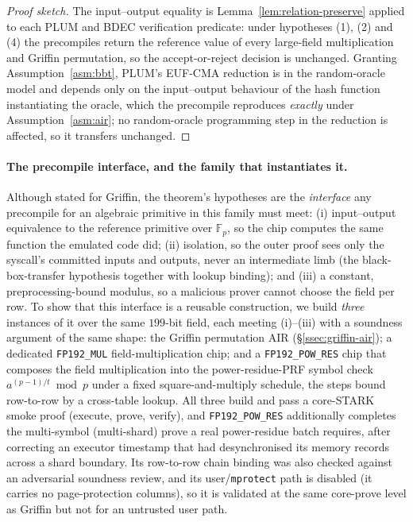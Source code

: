 \begin{proof}[Proof sketch]
The input--output equality is Lemma~\ref{lem:relation-preserve} applied to each PLUM and BDEC verification predicate: under hypotheses (1), (2) and (4) the precompiles return the reference value of every large-field multiplication and Griffin permutation, so the accept-or-reject decision is unchanged. Granting Assumption~\ref{asm:bbt}, PLUM's EUF-CMA reduction is in the random-oracle model and depends only on the input--output behaviour of the hash function instantiating the oracle, which the precompile reproduces \emph{exactly} under Assumption~\ref{asm:air}; no random-oracle programming step in the reduction is affected, so it transfers unchanged.
\end{proof}

\paragraph{The precompile interface, and the family that instantiates it.}
Although stated for Griffin, the theorem's hypotheses are the \emph{interface} any precompile for an algebraic primitive in this family must meet: (i) input--output equivalence to the reference primitive over $\mathbb{F}_p$, so the chip computes the same function the emulated code did; (ii) isolation, so the outer proof sees only the syscall's committed inputs and outputs, never an intermediate limb (the black-box-transfer hypothesis together with lookup binding); and (iii) a constant, preprocessing-bound modulus, so a malicious prover cannot choose the field per row. To show that this interface is a reusable construction, we build \emph{three} instances of it over the same $199$-bit field, each meeting (i)--(iii) with a soundness argument of the same shape: the Griffin permutation AIR (\S\ref{ssec:griffin-air}); a dedicated \texttt{FP192\_MUL} field-multiplication chip; and a \texttt{FP192\_POW\_RES} chip that composes the field multiplication into the power-residue-PRF symbol check $a^{(p-1)/t}\bmod p$ under a fixed square-and-multiply schedule, the steps bound row-to-row by a cross-table lookup. All three build and pass a core-STARK smoke proof (execute, prove, verify), and \texttt{FP192\_POW\_RES} additionally completes the multi-symbol (multi-shard) prove a real power-residue batch requires, after correcting an executor timestamp that had desynchronised its memory records across a shard boundary. Its row-to-row chain binding was also checked against an adversarial soundness review, and its user/\texttt{mprotect} path is disabled (it carries no page-protection columns), so it is validated at the same core-prove level as Griffin but not for an untrusted user path.

